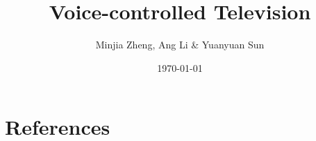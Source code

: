 \documentclass{beamer}
\title{Voice-controlled Television}
\author{Minjia Zheng, Ang Li \& Yuanyuan Sun}
\date{\today}
\begin{document}
\frame{\titlepage}











\section{References}
\begin{frame}[allowframebreaks]

\end{frame}
\end{document}
